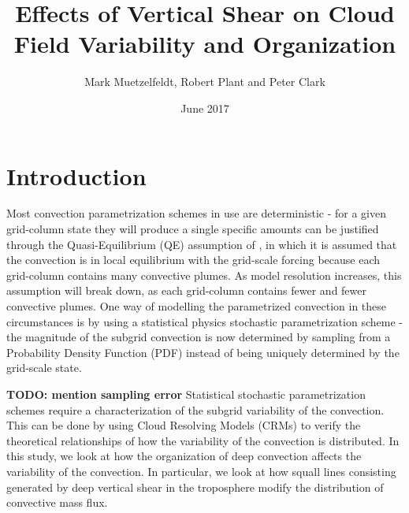 \documentclass[11pt,a4paper]{article}
\title{Effects of Vertical Shear on Cloud Field Variability and Organization }
\author{Mark Muetzelfeldt, Robert Plant and  Peter Clark}
\date{June 2017}
\newcommand\todo[1]{\textbf{TODO: #1}}
\begin{document}
\maketitle
\section{Introduction}

Most convection parametrization schemes in use are deterministic - for a given grid-column state they will produce a single specific amounts can be justified through the Quasi-Equilibrium (QE) assumption of \cite{arakawa1974interaction}, in which it is assumed that the convection is in local equilibrium with the grid-scale forcing because each grid-column contains many convective plumes. As model resolution increases, this assumption will break down, as each grid-column contains fewer and fewer convective plumes. One way of modelling the parametrized convection in these circumstances is by using a statistical physics stochastic parametrization scheme \parencite{berner2017stochastic} - the magnitude of the subgrid convection is now determined by sampling from a Probability Density Function (PDF) instead of being uniquely determined by the grid-scale state.

\todo{mention sampling error}
Statistical stochastic parametrization schemes require a characterization of the subgrid variability of the convection. This can be done by using Cloud Resolving Models (CRMs) to verify the theoretical relationships of how the variability of the convection is distributed. In this study, we look at how the organization of deep convection affects the variability of the convection. In particular, we look at how squall lines consisting generated by deep vertical shear in the troposphere modify the distribution of convective mass flux.

\end{document}
